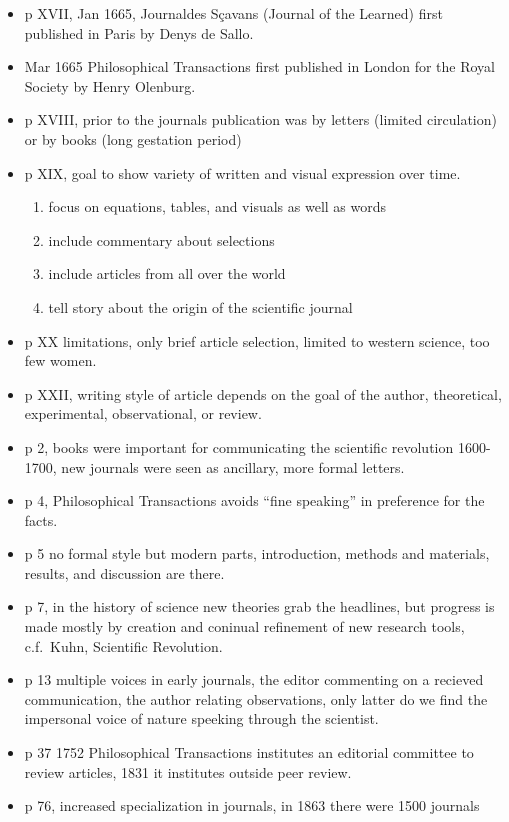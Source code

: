 \begin{itemize}
\item p XVII, Jan 1665, Journaldes S\c{c}avans (Journal of the Learned)
first published in Paris by Denys de Sallo.
\item Mar 1665 Philosophical Transactions first published in London for
the Royal Society by Henry Olenburg.
\item p XVIII, prior to the journals publication was by letters (limited
circulation) or by books (long gestation period)
\item p XIX, goal to show variety of written and visual expression over time.
\begin{enumerate}
  \item focus on equations, tables, and visuals as well as words  
  \item include commentary about selections
  \item include articles from all over the world
  \item tell story about the origin of the scientific journal
\end{enumerate}
\item p XX limitations, only brief article selection, limited to western science,
too few women.
\item p XXII, writing style of article depends on the goal of the author,
theoretical, experimental, observational, or review.
\item p 2, books were important for communicating the scientific revolution
1600-1700, new journals were seen as ancillary, more formal letters.
\item p 4, Philosophical Transactions avoids ``fine speaking'' in preference
for the facts.
\item p 5 no formal style but modern parts, introduction, methods and materials,
results, and discussion are there.
\item p 7, in the history of science new theories grab the headlines, but progress
is made mostly by creation and coninual refinement of new research tools, c.f.\ Kuhn, Scientific Revolution.
\item p 13 multiple voices in early journals, the editor commenting on a recieved
communication, the author relating observations, only latter do we find
the impersonal voice of nature speeking through the scientist.
\item p 37 1752 Philosophical Transactions institutes an editorial committee
to review articles, 1831 it institutes outside peer review.
\item p 76, increased specialization in journals, in 1863 there were 1500 journals

\end{itemize}
